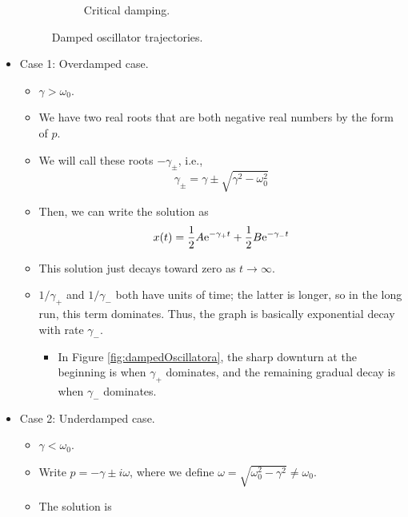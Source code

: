 \documentclass[../notes.tex]{subfiles}
\begin{document}
\begin{itemize}
\begin{figure}[h!]
\begin{subfigure}[b]{0.3\linewidth}
            \caption{Critical damping.}
            \label{fig:dampedOscillatorc}
        \end{subfigure}
        \caption{Damped oscillator trajectories.}
        \label{fig:dampedOscillator}
    \end{figure}
    \item Case 1: Overdamped case.
    \begin{itemize}
        \item $\gamma>\omega_0$.
        \item We have two real roots that are both negative real numbers by the form of $p$.
        \item We will call these roots $-\gamma_\pm$, i.e.,
        \begin{equation*}
            \gamma_\pm = \gamma\pm\sqrt{\gamma^2-\omega_0^2}
        \end{equation*}
        \item Then, we can write the solution as
        \begin{equation*}
            x(t) = \frac{1}{2}A\e[-\gamma_+t]+\frac{1}{2}B\e[-\gamma_-t]
        \end{equation*}
        \item This solution just decays toward zero as $t\to\infty$.
        \item $1/\gamma_+$ and $1/\gamma_-$ both have units of time; the latter is longer, so in the long run, this term dominates. Thus, the graph is basically exponential decay with rate $\gamma_-$.
        \begin{itemize}
            \item In Figure \ref{fig:dampedOscillatora}, the sharp downturn at the beginning is when $\gamma_+$ dominates, and the remaining gradual decay is when $\gamma_-$ dominates.
        \end{itemize}
    \end{itemize}
    \item Case 2: Underdamped case.
    \begin{itemize}
        \item $\gamma<\omega_0$.
        \item Write $p=-\gamma\pm i\omega$, where we define $\omega=\sqrt{\omega_0^2-\gamma^2}\neq\omega_0$.
        \item The solution is
        \begin{equation*}

\end{equation*}
\end{itemize}
\end{itemize}
\end{document}
